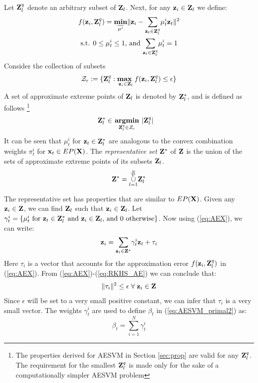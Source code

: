 \documentclass[twoside]{article}
\begin{document}
Let ${\bf Z}_l ^q$ denote an arbitrary subset of ${\bf Z}_l$. Next, for any ${\bf z}_i \in {\bf Z}_l$ we define:
\begin{align} \label{eq:AEX}
&f({\bf z}_i,{\bf Z}_l ^q) = \underset{\overline{\mu^i}}{\textbf{min}}\|{\bf z}_i - \underset{{\bf z}_t \in {\bf Z}_l ^q}{\sum} \mu^i _t {\bf z}_t\|^2 \\
&\text{ s.t. } 0 \le \mu^i _t \le 1 \text{, and } \underset{{\bf z}_t \in {\bf Z}_l ^q}{\sum} \mu^i _t = 1 \nonumber
\end{align}
Consider the collection of subsets
\begin{equation*}
{\cal Z}_\epsilon :=  \{{\bf Z}_l ^q: \underset{{\bf z}_i \in {\bf Z}_l}{\textbf{max }} f({\bf z}_i,{\bf Z}_l ^q) \le \epsilon\}
\end{equation*}
 A set of approximate extreme points of ${\bf Z}_l$ is denoted by ${\bf Z}_l ^*$, and is defined as follows \footnote{The properties derived for AESVM in Section \ref{sec:prop} are valid for any ${\bf Z}_l ^q$. The requirement for the smallest ${\bf Z}_l ^q$ is made only for the sake of a computationally simpler AESVM problem}
\begin{align} \label{eq:AEX2}
{\bf Z}_l ^* \in &\underset{{\bf Z}_l ^q \in {\cal Z}_\epsilon}{\textbf{ argmin }} |{\bf Z}_l ^q|
\end{align}
It can be seen that $\mu^i _t$ for ${\bf z}_t \in {\bf Z}_l ^*$ are  analogous to the convex combination weights $\pi^i _t$ for ${\bf x}_t \in EP({\bf X})$. The {\it representative set} ${\bf Z}^*$ of ${\bf Z}$ is the union of the sets of approximate extreme points of its subsets ${\bf Z}_l$.
\begin{equation*}\label{repZ}
{\bf Z}^* = \overset{\frac{N}{V}}{\underset{l = 1}{\cup}}{\bf Z}_l ^*
\end{equation*}

The representative set has properties that are similar to $EP({\bf X})$. Given any ${\bf z}_i \in {\bf Z}$, we can find ${\bf Z}_l$ such that ${\bf z}_i \in {\bf Z}_l$. Let $\gamma^i _t = \{\mu^i _t \text{ for } {\bf z}_t \in {\bf Z}_l ^* \text{ and }{\bf z}_i \in {\bf Z}_l \text{, and 0 otherwise}\}$. Now using (\ref{eq:AEX}), we can write:
\begin{equation}\label{eq:RKHS_AE}
{\bf z}_i = \underset{{\bf z}_t \in {\bf Z}^*}{\sum} \gamma^i _t{{\bf z}_t} + \tau_i
\end{equation}
Here $\tau_i$ is a vector that accounts for the approximation error $f({\bf z}_i,{\bf Z}_l ^q)$ in (\ref{eq:AEX}). From (\ref{eq:AEX})-(\ref{eq:RKHS_AE}) we can conclude that:
\begin{equation} \label{eq:tauNorm}
\|\tau_i\|^2 \le \epsilon \;\forall\; {\bf z}_i \in {\bf Z}
\end{equation}
Since $\epsilon$ will be set to a very small positive constant, we can infer that $\tau_i$ is a very small vector.  The weights $\gamma^i _t$ are used to define $\beta_t$ in (\ref{eq:AESVM_primal2}) as:
\begin{equation} \label{eq:betaDef}
\beta_t = \overset{N}{\underset{i = 1}\sum} \gamma^i _t
\end{equation}
\end{document}
